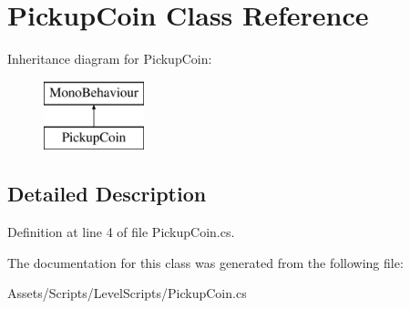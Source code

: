 \hypertarget{class_pickup_coin}{\section{Pickup\+Coin Class Reference}
\label{class_pickup_coin}
}
Inheritance diagram for Pickup\+Coin\+:\begin{figure}[H]
\begin{center}
\leavevmode
\includegraphics[height=2.000000cm]{class_pickup_coin}
\end{center}
\end{figure}


\subsection{Detailed Description}


Definition at line 4 of file Pickup\+Coin.\+cs.



The documentation for this class was generated from the following file\+:\begin{DoxyCompactItemize}
\item 
Assets/\+Scripts/\+Level\+Scripts/Pickup\+Coin.\+cs\end{DoxyCompactItemize}

